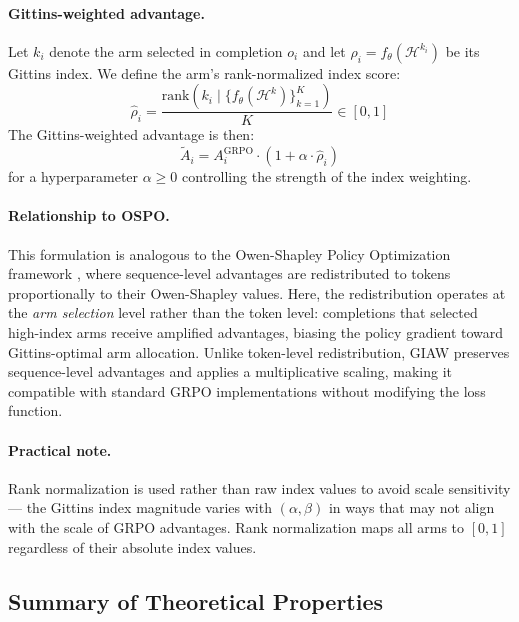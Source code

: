 \documentclass[11pt]{article}
\theoremstyle{plain}
\theoremstyle{definition}
\theoremstyle{remark}
\begin{document}
\paragraph{Gittins-weighted advantage.} Let $k_i$ denote the arm selected 
in completion $o_i$ and let $\rho_i = f_\theta(\mathcal{H}^{k_i})$ be its 
Gittins index. We define the arm's rank-normalized index score:
\begin{equation}
    \hat{\rho}_i = \frac{\text{rank}(k_i \mid \{f_\theta(\mathcal{H}^k)\}_{k=1}^K)}{K}
    \in [0, 1]
\end{equation}
The Gittins-weighted advantage is then:
\begin{equation}
    \tilde{A}_i = A_i^{\text{GRPO}} \cdot (1 + \alpha \cdot \hat{\rho}_i)
\end{equation}
for a hyperparameter $\alpha \geq 0$ controlling the strength of the 
index weighting.

\paragraph{Relationship to OSPO.} This formulation is analogous to the 
Owen-Shapley Policy Optimization framework \citep{nath2026owen}, where 
sequence-level advantages are redistributed to tokens proportionally to 
their Owen-Shapley values. Here, the redistribution operates at the 
\emph{arm selection} level rather than the token level: completions that 
selected high-index arms receive amplified advantages, biasing the policy 
gradient toward Gittins-optimal arm allocation. Unlike token-level 
redistribution, GIAW preserves sequence-level advantages and applies a 
multiplicative scaling, making it compatible with standard GRPO 
implementations without modifying the loss function.

\paragraph{Practical note.} Rank normalization is used rather than raw 
index values to avoid scale sensitivity — the Gittins index magnitude 
varies with $(\alpha, \beta)$ in ways that may not align with the scale 
of GRPO advantages. Rank normalization maps all arms to $[0,1]$ 
regardless of their absolute index values.

\subsection{Summary of Theoretical Properties}
\end{document}
